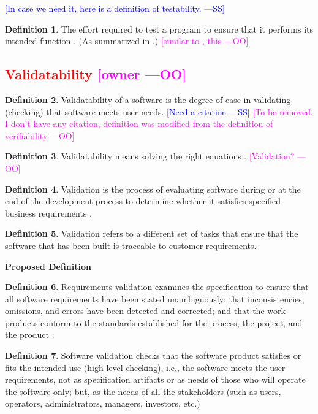 \documentclass[letterpaper,cleveref]{lipics-v2019}
\newcommand{\authornote}[3]{\textcolor{#1}{[#3 ---#2]}}
\newcommand{\authornote}[3]{}
\newcommand{\wss}[1]{\authornote{blue}{SS}{#1}} %
\newcommand{\oo}[1]{\authornote{magenta}{OO}{#1}} %
\newcommand{\notdone}[1]{\textcolor{red}{#1}}
\theoremstyle{definition}
\newtheorem{defn}{Definition}
\begin{document}
\wss{In case we need it, here is a definition of testability.}

\begin{defn}
	The effort required to test a program to ensure that it performs its
	intended function \citep{McCallEtAl1977}. (As summarized in
	\citet{VanVliet2000}.) \oo{similar to \citep{pressman2005software}, this}
\end{defn}


\subsection{\notdone{Validatability} \oo{owner}}

\begin{defn}
  Validatability of a software is the degree of ease in validating (checking)
  that software meets user needs. \wss{Need a citation} \oo{To be removed, I
    don't have any citation, definition was modified from the definition of
    verifiability}
\end{defn}

\begin{defn}
  Validatability means solving the right equations \citep[p.~23]{Roache1998}.
  \oo{Validation?}
\end{defn}

\begin{defn} \label{Validatability_Selected} 
  Validation is the process of evaluating software during or at the end of the
  development process to determine whether it satisfies specified business
  requirements \citep{softwaretestingfundamentals}.
\end{defn}

\begin{defn}
  Validation refers to a different set of tasks that ensure that the software
  that has been built is traceable to customer requirements.
\end{defn}
\noindent \textbf{Proposed Definition}

\begin{defn}
  Requirements validation examines the specification to ensure that all software
  requirements have been stated unambiguously; that inconsistencies, omissions,
  and errors have been detected and corrected; and that the work products
  conform to the standards established for the process, the project, and the
  product \citep{pressman2005software}.
\end{defn}

\begin{defn}
  Software validation checks that the software product satisfies or fits the
  intended use (high-level checking), i.e., the software meets the user
  requirements, not as specification artifacts or as needs of those who will
  operate the software only; but, as the needs of all the stakeholders (such as
  users, operators, administrators, managers, investors, etc.)
  \citep{WikipediaVnV}
\end{defn}
\end{document}
